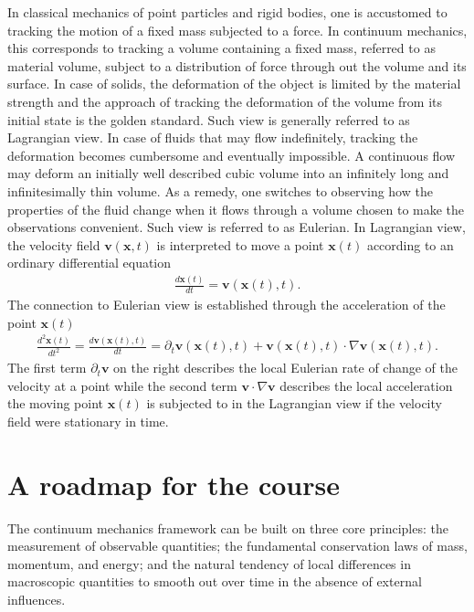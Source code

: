 In classical mechanics of point particles and rigid bodies, one is accustomed to tracking the motion of a fixed mass subjected to a force. In continuum mechanics, this corresponds to tracking a volume containing a fixed mass, referred to as material volume, subject to a distribution of force through out the volume and its surface. In case of solids, the deformation of the object is limited by the material strength and the approach of tracking the deformation of the volume from its initial state is the golden standard. Such view is generally referred to as Lagrangian view. In case of fluids that may flow indefinitely, tracking the deformation becomes cumbersome and eventually impossible. A continuous flow may deform an initially well described cubic volume into an infinitely long and infinitesimally thin volume. As a remedy, one switches to observing how the properties of the fluid change when it flows through a volume chosen to make the observations convenient. Such view is referred to as Eulerian. In Lagrangian view, the velocity field $\bm{v}(\bm{x},t)$ is interpreted to move a point $\bm{x}(t)$ according to an ordinary differential equation
\begin{align}
    \frac{d\bm{x}(t)}{dt}=\bm{v}(\bm{x}(t),t).
\end{align}
The connection to Eulerian view is established through the acceleration of the point $\bm{x}(t)$
\begin{align}
    \frac{d^2\bm{x}(t)}{dt^2}=\frac{d\bm{v}(\bm{x}(t),t)}{dt}=\partial_t\bm{v}(\bm{x}(t),t)+\bm{v}(\bm{x}(t),t)\cdot\nabla\bm{v}(\bm{x}(t),t).
\end{align}
The first term $\partial_t\bm{v}$ on the right describes the local Eulerian rate of change of the velocity at a point while the second term $\bm{v}\cdot\nabla\bm{v}$ describes the local acceleration the moving point $\bm{x}(t)$ is subjected to in the Lagrangian view if the velocity field were stationary in time.

\section{A roadmap for the course}
The continuum mechanics framework can be built on three core principles: the measurement of observable quantities; the fundamental conservation laws of mass, momentum, and energy; and the natural tendency of local differences in macroscopic quantities to smooth out over time in the absence of external influences. 

